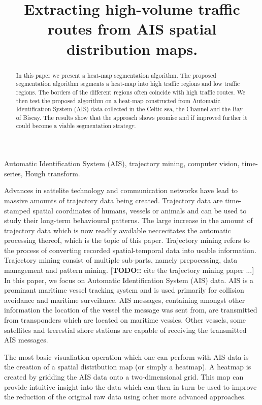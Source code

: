 \documentclass{article}
\title{Extracting high-volume traffic routes from AIS spatial distribution maps.}
\begin{document}
%
\maketitle
%
\begin{abstract}
In this paper we present a heat-map segmentation algorithm. The proposed segmentation algorithm
segments a heat-map into high traffic regions and low traffic regions. The borders of the different regions often coincide with high traffic routes. We then test the proposed 
algorithm on a heat-map constructed from Automatic Identification System (AIS) data collected in the Celtic sea, the Channel and the Bay of Biscay. The results show that the approach shows promise and if improved further 
it could become a viable segmentation strategy.
\end{abstract}
%
\begin{keywords}
Automatic Identification System (AIS), trajectory mining, computer vision, time-series, Hough transform.
\end{keywords}
\begin{abstract}
\end{abstract}
Advances in sattelite technology and communication networks have lead to massive amounts of trajectory data being created. 
Trajectory data are time-stamped spatial coordinates of humans, vessels or animals and can be used to study their long-term behavioural patterns. The large increase 
in the amount of trajectory data which is now readily available neccecitates the automatic processing thereof, which is the topic of this paper.
Trajectory mining refers to the process of converting recorded spatial-temporal data into usable information. Trajectory mining consist of multiple sub-parts, namely 
prepocessing, data management and pattern mining.  [\textbf{TODO::} cite the trajectory mining paper ...] 
In this paper, we focus on Automatic Identification System (AIS) data. AIS is a prominant maritime vessel tracking system and is used primarily 
for collision avoidance and maritime surveilance. AIS messages, containing amongst other information the location of the vessel the message was sent from, are transmitted from transponders which are located 
on maritime vessles. Other vessels, some satellites and trerestial shore stations are capable of receiving the transmitted AIS messages.

The most basic visualiation operation which one can perform with AIS data is the creation of a spatial distribution map (or simply a heatmap). A heatmap 
is created by gridding the AIS data onto a two-dimensional grid. This map can provide 
intuitive insight into the data which can then in turn be used to improve the reduction of the original raw data using other more advanced approaches.
\end{document}
